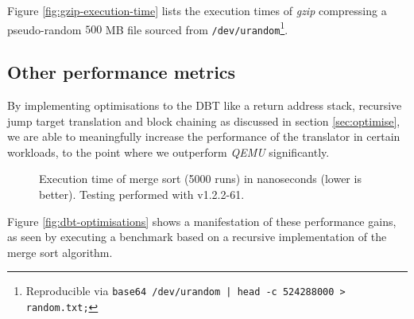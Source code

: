 Figure \vref{fig:gzip-execution-time} lists the execution times of \textit{gzip} compressing a pseudo-random $500$ MB file sourced from \texttt{/dev/urandom}\footnote{Reproducible via \texttt{base64 /dev/urandom | head -c 524288000 > random.txt;}}.

\subsection{Other performance metrics}
By implementing optimisations to the DBT like a return address stack, recursive jump target translation and block chaining as discussed in section \vref{sec:optimise}, we are able to meaningfully increase the performance of the translator in certain workloads, to the point where we outperform \textit{QEMU} significantly.

\begin{figure}[h]
	\centering
	\caption[Execution time of merge sort (5000 runs)]%
	{Execution time of merge sort (5000 runs) in nanoseconds (lower is better). Testing performed with v1.2.2-61.}
	\label{fig:dbt-optimisations}
\end{figure}

Figure \vref{fig:dbt-optimisations} shows a manifestation of these performance gains, as seen by executing a benchmark based on a recursive implementation of the merge sort algorithm.






















